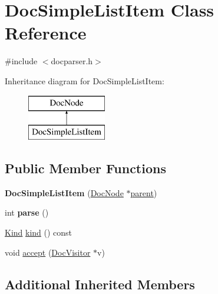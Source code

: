 \hypertarget{class_doc_simple_list_item}{}\section{Doc\+Simple\+List\+Item Class Reference}
\label{class_doc_simple_list_item}


{\ttfamily \#include $<$docparser.\+h$>$}

Inheritance diagram for Doc\+Simple\+List\+Item\+:\begin{figure}[H]
\begin{center}
\leavevmode
\includegraphics[height=2.000000cm]{class_doc_simple_list_item}
\end{center}
\end{figure}
\subsection*{Public Member Functions}
\begin{DoxyCompactItemize}
\item 
\mbox{\label{class_doc_simple_list_item_a4f94bf7f0685a2cb3e8fc2a88099e6be}} 
{\bfseries Doc\+Simple\+List\+Item} (\mbox{\hyperlink{class_doc_node}{Doc\+Node}} $\ast$\mbox{\hyperlink{class_doc_node_a73e8ad29a91cfceb0968eb00db71a23d}{parent}})
\item 
\mbox{\label{class_doc_simple_list_item_a040ca2df33767ae455642894b4193591}} 
int {\bfseries parse} ()
\item 
\mbox{\hyperlink{class_doc_node_aebd16e89ca590d84cbd40543ea5faadb}{Kind}} \mbox{\hyperlink{class_doc_simple_list_item_a2b1411741c8d4903b12763361c872bcd}{kind}} () const
\item 
void \mbox{\hyperlink{class_doc_simple_list_item_a977fe7d09d43c8bad1f91ddeac6f37f3}{accept}} (\mbox{\hyperlink{class_doc_visitor}{Doc\+Visitor}} $\ast$v)
\end{DoxyCompactItemize}
\subsection*{Additional Inherited Members}


